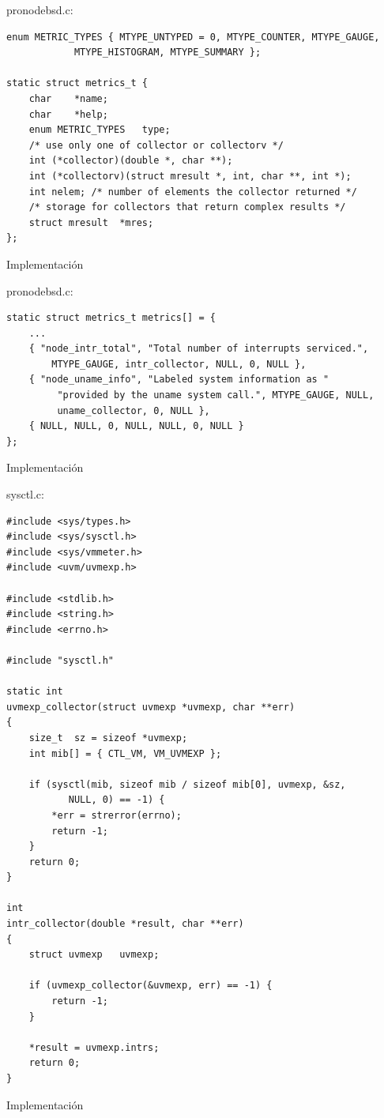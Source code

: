 \documentclass[11pt,spanish]{article}
\newcommand{\rowsp}[1][1em]{\vspace{#1}}
\newcommand{\hone}[1]{{\rowsp[0.3em]\noindent\Large #1 \rowsp[0.3em]}}
\begin{document}
pronodebsd.c:
\begin{lstlisting}
enum METRIC_TYPES { MTYPE_UNTYPED = 0, MTYPE_COUNTER, MTYPE_GAUGE,
			MTYPE_HISTOGRAM, MTYPE_SUMMARY };

static struct metrics_t {
	char	*name;
	char	*help;
	enum METRIC_TYPES	type;
	/* use only one of collector or collectorv */
	int	(*collector)(double *, char **);
	int	(*collectorv)(struct mresult *, int, char **, int *);
	int	nelem; /* number of elements the collector returned */
	/* storage for collectors that return complex results */
	struct mresult	*mres;
};
\end{lstlisting}

\newpage %
\hone{Implementación}

pronodebsd.c:
\begin{lstlisting}
static struct metrics_t metrics[] = {
	...
	{ "node_intr_total", "Total number of interrupts serviced.",
	    MTYPE_GAUGE, intr_collector, NULL, 0, NULL },
	{ "node_uname_info", "Labeled system information as "
	     "provided by the uname system call.", MTYPE_GAUGE, NULL,
	     uname_collector, 0, NULL },
	{ NULL, NULL, 0, NULL, NULL, 0, NULL }
};
\end{lstlisting}

\newpage %
\hone{Implementación}

sysctl.c:
\begin{lstlisting}
#include <sys/types.h>
#include <sys/sysctl.h>
#include <sys/vmmeter.h>
#include <uvm/uvmexp.h>

#include <stdlib.h>
#include <string.h>
#include <errno.h>

#include "sysctl.h"

static int
uvmexp_collector(struct uvmexp *uvmexp, char **err)
{
	size_t	sz = sizeof *uvmexp;
	int	mib[] = { CTL_VM, VM_UVMEXP };

	if (sysctl(mib, sizeof mib / sizeof mib[0], uvmexp, &sz,
		   NULL, 0) == -1) {
		*err = strerror(errno);
		return -1;
	}
	return 0;
}

int
intr_collector(double *result, char **err)
{
	struct uvmexp	uvmexp;

	if (uvmexp_collector(&uvmexp, err) == -1) {
		return -1;
	}

	*result = uvmexp.intrs;
	return 0;
}
\end{lstlisting}

\newpage %
\hone{Implementación}
\end{document}
